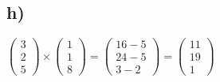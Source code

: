 \subsection*{h)}
$
\begin{pmatrix}
3 \\
2 \\
5
\end{pmatrix}
\times
\begin{pmatrix}
1 \\
1 \\
8
\end{pmatrix}
=
\begin{pmatrix}
16-5 \\
24 - 5 \\
3 - 2
\end{pmatrix}
=
\begin{pmatrix}
11 \\
19 \\
1
\end{pmatrix}
$